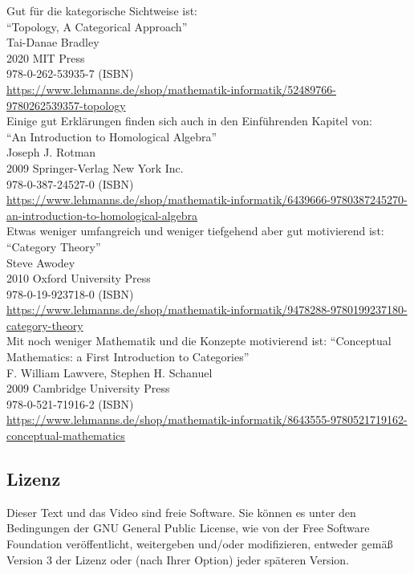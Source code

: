 \documentclass[a4paper]{amsart}
\theoremstyle{definition}
\begin{document}
Gut für die kategorische Sichtweise ist:\\
"`Topology, A Categorical Approach"'\\
Tai-Danae Bradley\\
2020 MIT Press\\
978-0-262-53935-7 (ISBN)\\
{\tiny
\url{https://www.lehmanns.de/shop/mathematik-informatik/52489766-9780262539357-topology}}\\

Einige gut Erklärungen finden sich auch in den Einführenden Kapitel von:\\
"`An Introduction to Homological Algebra"'\\
Joseph J. Rotman\\
2009 Springer-Verlag New York Inc.\\
978-0-387-24527-0 (ISBN)\\
{\tiny \url{https://www.lehmanns.de/shop/mathematik-informatik/6439666-9780387245270-an-introduction-to-homological-algebra}}\\

Etwas weniger umfangreich und weniger tiefgehend aber gut motivierend ist:
"`Category Theory"'\\
Steve Awodey\\
2010 Oxford University Press\\
978-0-19-923718-0 (ISBN)\\
{\tiny\url{https://www.lehmanns.de/shop/mathematik-informatik/9478288-9780199237180-category-theory}}\\

Mit noch weniger Mathematik und die Konzepte motivierend ist:
"`Conceptual Mathematics: a First Introduction to Categories"'\\
F. William Lawvere, Stephen H. Schanuel\\
2009 Cambridge University Press\\
978-0-521-71916-2 (ISBN)\\
{\tiny\url{https://www.lehmanns.de/shop/mathematik-informatik/8643555-9780521719162-conceptual-mathematics}}

\subsection*{Lizenz}
Dieser Text und das Video sind freie Software. Sie können es unter den Bedingungen der
GNU General Public License, wie von der Free Software Foundation veröffentlicht, weitergeben
und/oder modifizieren, entweder gemäß Version 3 der Lizenz oder (nach Ihrer Option) jeder späteren Version.
\end{document}
